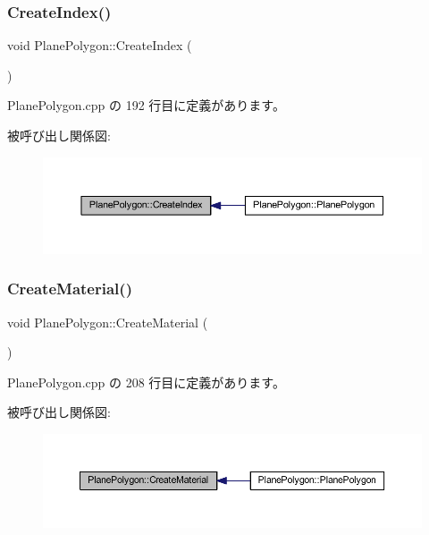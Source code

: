 \subsubsection{\texorpdfstring{Create\+Index()}{CreateIndex()}}
{\footnotesize\ttfamily void Plane\+Polygon\+::\+Create\+Index (\begin{DoxyParamCaption}{ }\end{DoxyParamCaption})\hspace{0.3cm}{\ttfamily [private]}}



 Plane\+Polygon.\+cpp の 192 行目に定義があります。

被呼び出し関係図\+:\nopagebreak
\begin{figure}[H]
\begin{center}
\leavevmode
\includegraphics[width=350pt]{class_plane_polygon_a55840ace8bfa216c37f94e963b3fa5e3_icgraph}
\end{center}
\end{figure}
\mbox{\label{class_plane_polygon_a4539899c78a222ddc651e45943a7f55b}} 
\subsubsection{\texorpdfstring{Create\+Material()}{CreateMaterial()}}
{\footnotesize\ttfamily void Plane\+Polygon\+::\+Create\+Material (\begin{DoxyParamCaption}{ }\end{DoxyParamCaption})\hspace{0.3cm}{\ttfamily [private]}}



 Plane\+Polygon.\+cpp の 208 行目に定義があります。

被呼び出し関係図\+:\nopagebreak
\begin{figure}[H]
\begin{center}
\leavevmode
\includegraphics[width=350pt]{class_plane_polygon_a4539899c78a222ddc651e45943a7f55b_icgraph}
\end{center}
\end{figure}
\mbox{\label{class_plane_polygon_aa002e213c1b0481c8b8ee56caadd270d}} 

